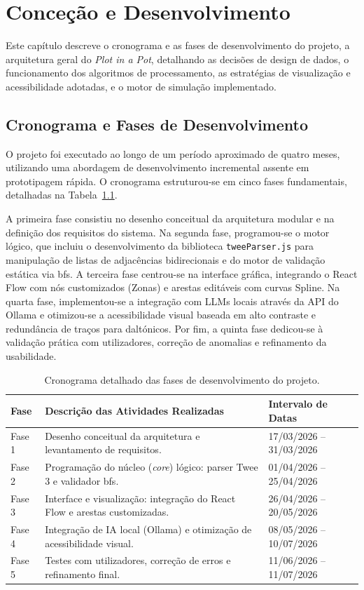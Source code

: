 \chapter{Conceção e Desenvolvimento}
\label{cp:concecao-implementacao}

Este capítulo descreve o cronograma e as fases de desenvolvimento do projeto, a arquitetura geral do \textit{Plot in a Pot}, detalhando as decisões de design de dados, o funcionamento dos algoritmos de processamento, as estratégias de visualização e acessibilidade adotadas, e o motor de simulação implementado.

\section{Cronograma e Fases de Desenvolvimento}
\label{sec:cronograma-desenvolvimento-fases}
O projeto foi executado ao longo de um período aproximado de quatro meses, utilizando uma abordagem de desenvolvimento incremental assente em prototipagem rápida. O cronograma estruturou-se em cinco fases fundamentais, detalhadas na Tabela~\ref{tab:cronograma-desenvolvimento}. 

A primeira fase consistiu no desenho conceitual da arquitetura modular e na definição dos requisitos do sistema. Na segunda fase, programou-se o motor lógico, que incluiu o desenvolvimento da biblioteca \texttt{tweeParser.js} para manipulação de listas de adjacências bidirecionais e do motor de validação estática via \gls{bfs}. A terceira fase centrou-se na interface gráfica, integrando o React Flow com nós customizados (Zonas) e arestas editáveis com curvas Spline. Na quarta fase, implementou-se a integração com LLMs locais através da API do Ollama e otimizou-se a acessibilidade visual baseada em alto contraste e redundância de traços para daltónicos. Por fim, a quinta fase dedicou-se à validação prática com utilizadores, correção de anomalias e refinamento da usabilidade.

\begin{table}[H]
\centering
\caption{Cronograma detalhado das fases de desenvolvimento do projeto.}
\label{tab:cronograma-desenvolvimento}
\begin{tabularx}{\textwidth}{lXl}
\toprule
\textbf{Fase} & \textbf{Descrição das Atividades Realizadas} & \textbf{Intervalo de Datas} \\
\midrule
Fase 1 & Desenho conceitual da arquitetura e levantamento de requisitos. & 17/03/2026 -- 31/03/2026 \\
Fase 2 & Programação do núcleo (\textit{core}) lógico: parser Twee 3 e validador \gls{bfs}. & 01/04/2026 -- 25/04/2026 \\
Fase 3 & Interface e visualização: integração do React Flow e arestas customizadas. & 26/04/2026 -- 20/05/2026 \\
Fase 4 & Integração de IA local (Ollama) e otimização de acessibilidade visual. & 08/05/2026 -- 10/07/2026 \\
Fase 5 & Testes com utilizadores, correção de erros e refinamento final. & 11/06/2026 -- 11/07/2026 \\
\bottomrule
\end{tabularx}
\end{table}

